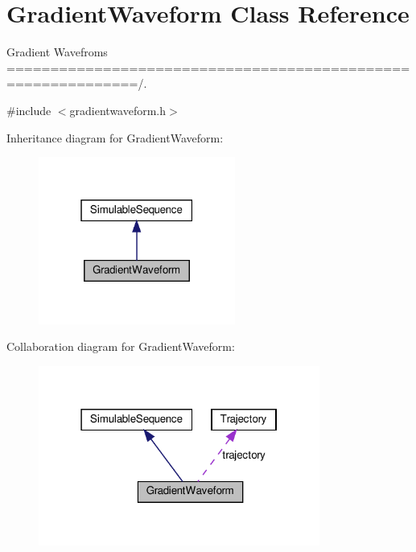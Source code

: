 \hypertarget{class_gradient_waveform}{}\section{Gradient\+Waveform Class Reference}
\label{class_gradient_waveform}


Gradient Wavefroms =============================================================/.  




{\ttfamily \#include $<$gradientwaveform.\+h$>$}



Inheritance diagram for Gradient\+Waveform\+:\nopagebreak
\begin{figure}[H]
\begin{center}
\leavevmode
\includegraphics[width=183pt]{class_gradient_waveform__inherit__graph}
\end{center}
\end{figure}


Collaboration diagram for Gradient\+Waveform\+:\nopagebreak
\begin{figure}[H]
\begin{center}
\leavevmode
\includegraphics[width=262pt]{class_gradient_waveform__coll__graph}
\end{center}
\end{figure}
